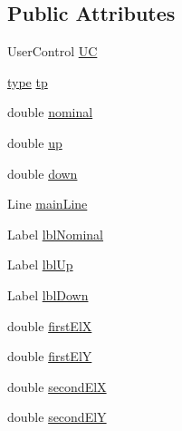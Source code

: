 \subsection*{Public Attributes}
\begin{DoxyCompactItemize}
\item 
User\+Control \mbox{\hyperlink{class_dimension___chain_1_1_u_i___dimension_ade41252d28cea667eee14bad5bc1f9a2}{UC}}
\item 
\mbox{\hyperlink{namespace_dimension___chain_a6ec9051138598c61cc00acf2547dced4}{type}} \mbox{\hyperlink{class_dimension___chain_1_1_u_i___dimension_a6b40d21e1d4e51662827a615ef8f7564}{tp}}
\item 
double \mbox{\hyperlink{class_dimension___chain_1_1_u_i___dimension_aacc27fe94a037362f35b1c697cc671b4}{nominal}}
\item 
double \mbox{\hyperlink{class_dimension___chain_1_1_u_i___dimension_a3707451432d8b5471987be754732a75d}{up}}
\item 
double \mbox{\hyperlink{class_dimension___chain_1_1_u_i___dimension_a9893562e547e690ab725abce322a6a93}{down}}
\item 
Line \mbox{\hyperlink{class_dimension___chain_1_1_u_i___dimension_a73fe19b1c68179a37404e48d507b3901}{main\+Line}}
\item 
Label \mbox{\hyperlink{class_dimension___chain_1_1_u_i___dimension_ae78dcce1629029eade09cb44f4a97fa1}{lbl\+Nominal}}
\item 
Label \mbox{\hyperlink{class_dimension___chain_1_1_u_i___dimension_a799c81f3afaccb4e41fb19f099115108}{lbl\+Up}}
\item 
Label \mbox{\hyperlink{class_dimension___chain_1_1_u_i___dimension_a846b7751f2e526b7e30d0adffeac2327}{lbl\+Down}}
\item 
double \mbox{\hyperlink{class_dimension___chain_1_1_u_i___dimension_ab318784d1335aab7dd2622dbe7b28581}{first\+ElX}}
\item 
double \mbox{\hyperlink{class_dimension___chain_1_1_u_i___dimension_a37095262fa1ad821965fffb198842a3b}{first\+ElY}}
\item 
double \mbox{\hyperlink{class_dimension___chain_1_1_u_i___dimension_a134bfa41b935cd3250fc11cd5c1162e0}{second\+ElX}}
\item 
double \mbox{\hyperlink{class_dimension___chain_1_1_u_i___dimension_a55a719dbec616ef27aa758244c9eed64}{second\+ElY}}
\end{DoxyCompactItemize}
